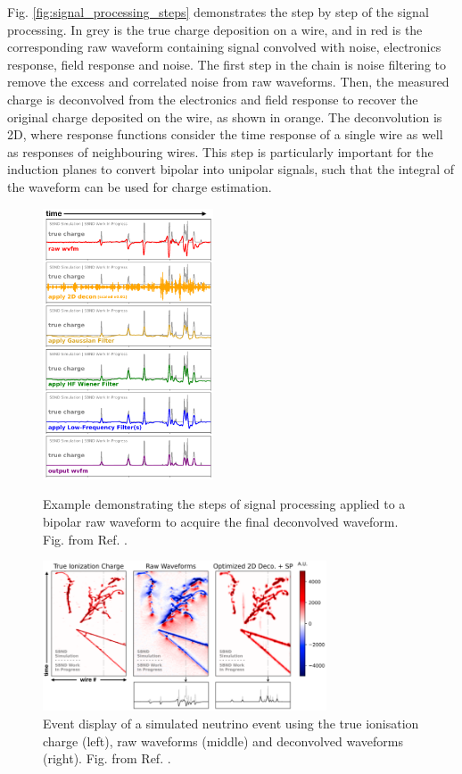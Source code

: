 Fig. \ref{fig:signal_processing_steps} \cite{} demonstrates the step by step of the signal processing.
In grey is the true charge deposition on a wire, and in red is the corresponding raw waveform containing signal convolved with noise, electronics response, field response and noise.
The first step in the chain is noise filtering to remove the excess and correlated noise from raw waveforms.
Then, the measured charge is deconvolved from the electronics and field response to recover the original charge deposited on the wire, as shown in orange.
The deconvolution is 2D, where response functions consider the time response of a single wire as well as responses of neighbouring wires.
This step is particularly important for the induction planes to convert bipolar into unipolar signals, such that the integral of the waveform can be used for charge estimation.
\begin{figure}[tbp!] 
\centering    
\includegraphics[width=0.45\textwidth]{signal_processing_steps}
\caption[signal_processing_steps]{
Example demonstrating the steps of signal processing applied to a bipolar raw waveform to acquire the final deconvolved waveform.
Fig. from Ref. \cite{}.
}
\label{fig:signal_processing_steps}
\centering    
\includegraphics[width=0.75\textwidth]{signal_processing_waveform}
\caption[signal_processing_waveform]{
Event display of a simulated neutrino event using the true ionisation charge (left), raw waveforms (middle) and deconvolved waveforms (right).
Fig. from Ref. \cite{}.
}
\label{fig:signal_processing_waveform}
\end{figure}
